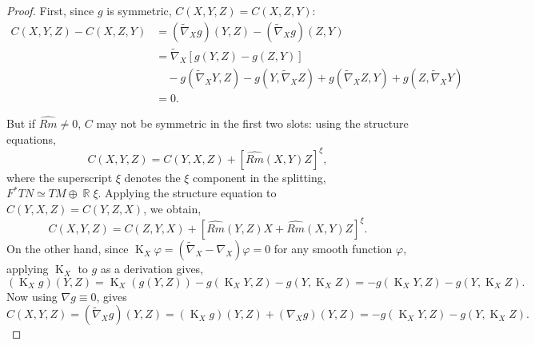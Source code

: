 \documentclass{amsart}
\theoremstyle{definition}
\theoremstyle{remark}
\DeclareMathOperator{\diff}{K}
\DeclareMathOperator{\RR}{\mathbb{R}}
\numberwithin{equation}{section}
\begin{document}
\begin{proof}
First, since $g$ is symmetric, $C(X, Y, Z) = C(X, Z, Y)$:
\[
\begin{split}
C(X, Y, Z) - C(X, Z, Y) &= (\tilde{\nabla}_X g) (Y, Z) - (\tilde{\nabla}_X g) (Z, Y) \\
&= \tilde{\nabla}_X \left[g(Y, Z) - g(Z, Y)\right] \\
&\quad - g(\tilde{\nabla}_X Y, Z) - g(Y, \tilde{\nabla}_X Z) + g(\tilde{\nabla}_X Z, Y) + g(Z, \tilde{\nabla}_X Y) \\
&= 0.
\end{split}
\]

But if $\widehat{Rm} \ne 0$, $C$ may not be symmetric in the first two slots: using the structure equations,
\begin{equation}
\label{eq:cubic_symmetry}
C(X, Y, Z) = C(Y, X, Z) + [\widehat{Rm}(X, Y)Z]^{\xi},
\end{equation}
where the superscript $\xi$ denotes the $\xi$ component in the splitting, $F^{\ast} TN \simeq TM \oplus \RR \xi$. Applying the structure equation to $C(Y, X, Z) = C(Y, Z, X)$, we obtain,
\begin{equation}
\label{eq:cubic_permutation1}
C(X, Y, Z) = C(Z, Y, X) + \left[\widehat{Rm}(Y, Z) X + \widehat{Rm}(X, Y) Z\right]^{\xi}.
\end{equation}
On the other hand, since $\diff_X \varphi = (\tilde{\nabla}_X - \nabla_X) \varphi = 0$ for any smooth function $\varphi$, applying $\diff_X$ to $g$ as a derivation gives,
\[
(\diff_X g) (Y, Z) = \diff_X (g(Y, Z)) - g(\diff_X Y, Z) - g(Y, \diff_X Z) = -g(\diff_X Y, Z) - g(Y, \diff_X Z).
\]
Now using $\nabla g \equiv 0$, gives
\begin{equation}
\label{eq:cubic_derivation_identity}
C(X, Y, Z) = (\tilde{\nabla}_X g) (Y, Z) = (\diff_X g) (Y, Z) + (\nabla_X g) (Y, Z) = -g(\diff_X Y, Z) - g(Y, \diff_X Z).
\end{equation}


\end{proof}
\end{document}
